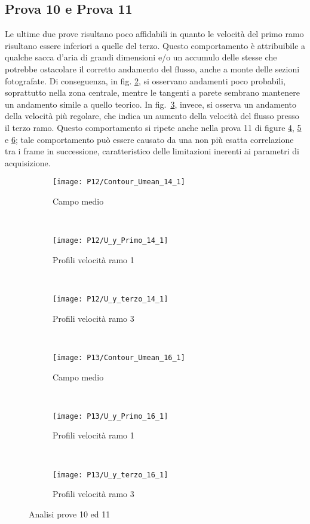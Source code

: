 \documentclass{article} %
\begin{document}
\subsection{Prova 10 e Prova 11}
Le ultime due prove risultano poco affidabili in quanto le velocità del primo ramo risultano essere inferiori a quelle del terzo. Questo comportamento è attribuibile a qualche sacca d'aria di grandi dimensioni e/o un accumulo delle stesse che potrebbe ostacolare il corretto andamento del flusso, anche a monte delle sezioni fotografate. Di conseguenza, in fig. \ref{fig:U1_y10}, si osservano andamenti poco probabili, soprattutto nella zona centrale, mentre le tangenti a parete sembrano mantenere un andamento simile a quello teorico. In fig.~\ref{fig:U3_y10}, invece, si osserva un andamento della velocità più regolare, che indica un aumento della velocità del flusso presso il terzo ramo. Questo comportamento si ripete anche nella prova 11 di figure \ref{fig:MEAN_U11}, \ref{fig:U1_y11} e \ref{fig:U3_y11}; tale comportamento può essere causato da una non più esatta correlazione tra i frame in successione, caratteristico delle limitazioni inerenti ai parametri di acquisizione.
\begin{figure}[h!]
	\centering
	\begin{subfigure}{0.22\textwidth}
		\texttt{[image: P12/Contour\_Umean\_14\_1]}
		\caption{Campo medio}
		\label{fig:MEAN_U10}
	\end{subfigure} ~ \hspace{1cm}
	\begin{subfigure}{0.22\textwidth}
		\texttt{[image: P12/U\_y\_Primo\_14\_1]}
		\caption{Profili velocità ramo 1}
		\label{fig:U1_y10}
	\end{subfigure} ~  \hspace{1cm}
	\begin{subfigure}{0.22\textwidth}
		\texttt{[image: P12/U\_y\_terzo\_14\_1]}
		\caption{Profili velocità ramo 3}
		\label{fig:U3_y10}	
	\end{subfigure} \\
	\begin{subfigure}{0.22\textwidth}
		\texttt{[image: P13/Contour\_Umean\_16\_1]}
		\caption{Campo medio}
		\label{fig:MEAN_U11}
	\end{subfigure} ~ \hspace{1cm}
	\begin{subfigure}{0.22\textwidth}
		\texttt{[image: P13/U\_y\_Primo\_16\_1]}
		\caption{Profili velocità ramo 1}
		\label{fig:U1_y11}
	\end{subfigure} ~  \hspace{1cm}
	\begin{subfigure}{0.22\textwidth}
		\texttt{[image: P13/U\_y\_terzo\_16\_1]}
		\caption{Profili velocità ramo 3}
		\label{fig:U3_y11}	
	\end{subfigure}  
	\caption{Analisi prove 10 ed 11}
	\label{fig:10}
\end{figure}
\end{document}

